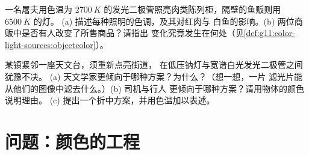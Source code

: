 \begin{exercise}[$\star\star\star$]\label{exo:g11:color-light-sources:14}
一名屠夫用色温为
$\qty{2700}{K}$ 的发光二极管照亮肉类陈列柜，隔壁的鱼贩则用 $\qty{6500}{K}$ 的灯。
(a) 描述每种照明的色调，及其对红肉与
白鱼的影响。(b) 两位商贩中是否有人改变了所售商品？请指出
变化究竟发生在何处（见\cref{def:g11:color-light-sources:objectcolor}）。
\end{exercise}

\begin{exercise}[$\star\star\star$]\label{exo:g11:color-light-sources:15}
某镇紧邻一座天文台，须重新点亮街道，
在低压钠灯与宽谱白光发光二极管之间犹豫不决。
(a) 天文学家更倾向于哪种方案？为什么？（想一想，一片
滤光片能从他们的图像中滤去什么。）(b) 司机与行人
更倾向于哪种方案？请用物体的颜色说明理由。
(c) 提出一个折中方案，并用色温加以表述。
\end{exercise}

\section{问题：颜色的工程}

